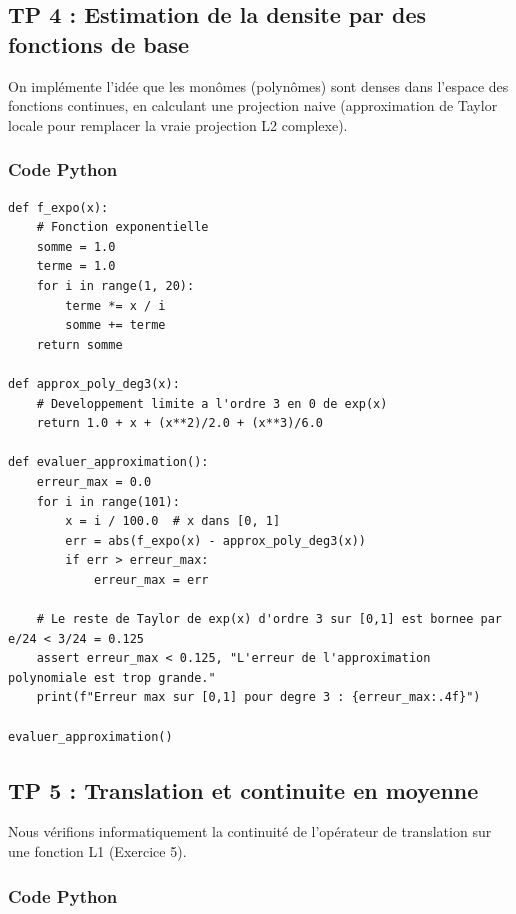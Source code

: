\documentclass[11pt,a4paper]{article}
\begin{document}
\subsection*{TP 4 : Estimation de la densite par des fonctions de base}

On implémente l'idée que les monômes (polynômes) sont denses dans l'espace des fonctions continues, en calculant une projection naive (approximation de Taylor locale pour remplacer la vraie projection L2 complexe).

\subsubsection*{Code Python}

\begin{lstlisting}
def f_expo(x):
    # Fonction exponentielle
    somme = 1.0
    terme = 1.0
    for i in range(1, 20):
        terme *= x / i
        somme += terme
    return somme

def approx_poly_deg3(x):
    # Developpement limite a l'ordre 3 en 0 de exp(x)
    return 1.0 + x + (x**2)/2.0 + (x**3)/6.0

def evaluer_approximation():
    erreur_max = 0.0
    for i in range(101):
        x = i / 100.0  # x dans [0, 1]
        err = abs(f_expo(x) - approx_poly_deg3(x))
        if err > erreur_max:
            erreur_max = err

    # Le reste de Taylor de exp(x) d'ordre 3 sur [0,1] est bornee par e/24 < 3/24 = 0.125
    assert erreur_max < 0.125, "L'erreur de l'approximation polynomiale est trop grande."
    print(f"Erreur max sur [0,1] pour degre 3 : {erreur_max:.4f}")

evaluer_approximation()
\end{lstlisting}


\subsection*{TP 5 : Translation et continuite en moyenne}

Nous vérifions informatiquement la continuité de l'opérateur de translation sur une fonction L1 (Exercice 5).

\subsubsection*{Code Python}
\end{document}
